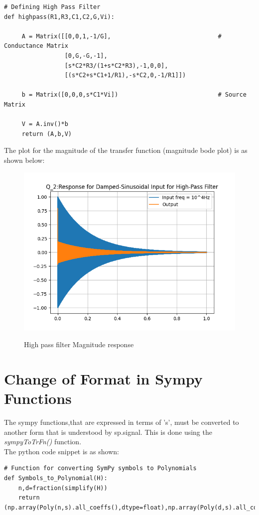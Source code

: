 \documentclass[11pt, a4paper]{article}
\begin{document}
\begin{verbatim}
# Defining High Pass Filter    
def highpass(R1,R3,C1,C2,G,Vi):                     
     
     A = Matrix([[0,0,1,-1/G],                              # Conductance Matrix
                 [0,G,-G,-1],
                 [s*C2*R3/(1+s*C2*R3),-1,0,0],
                 [(s*C2+s*C1+1/R1),-s*C2,0,-1/R1]])
                 
     b = Matrix([0,0,0,s*C1*Vi])                            # Source Matrix
     
     V = A.inv()*b
     return (A,b,V) 
\end{verbatim}
The plot for the magnitude of the transfer function (magnitude bode plot) is as shown below:
\begin{figure}[!tbh]
   	\centering
   	\includegraphics[width=1.0\textwidth]{Figure3.png}
   	\label{fig:32}
   	\caption{High pass filter Magnitude response}
   \end{figure}
\section*{Change of Format in Sympy Functions}
The sympy functions,that are expressed in terms of 's', must be converted to another form that is understood by sp.signal. This is done using the \textit{sympyToTrFn()} function.\\
The python code snippet is as shown:
 \begin{verbatim}
# Function for converting SymPy symbols to Polynomials     
def Symbols_to_Polynomial(H):
	n,d=fraction(simplify(H))
	return (np.array(Poly(n,s).all_coeffs(),dtype=float),np.array(Poly(d,s).all_coeffs(),dtype=float))
\end{verbatim}	
\end{document}
